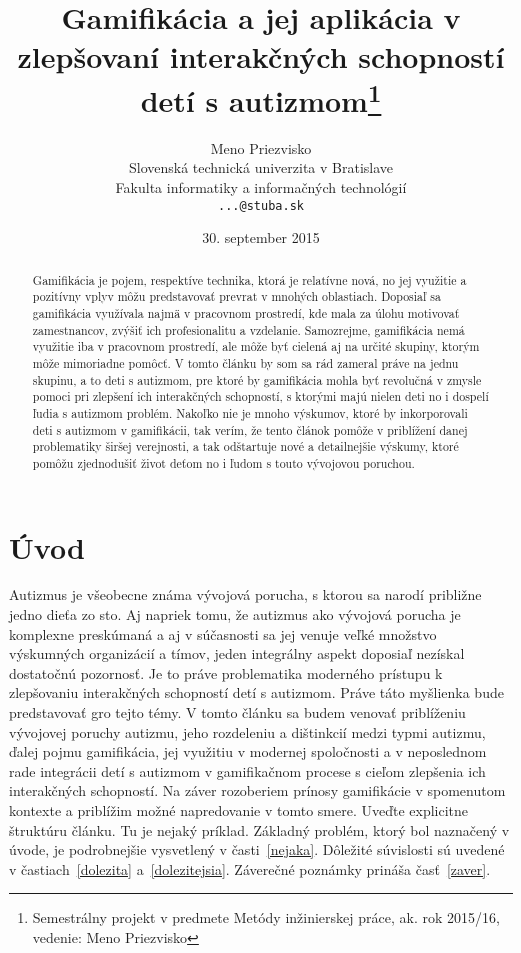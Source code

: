 \documentclass[10pt,twoside,slovak,a4paper]{coursepaper}
\title{Gamifikácia a jej aplikácia v zlepšovaní interakčných schopností detí s autizmom\thanks{Semestrálny projekt v predmete Metódy inžinierskej práce, ak. rok 2015/16, vedenie: Meno Priezvisko}} %
\author{Meno Priezvisko\\[2pt]
	{\small Slovenská technická univerzita v Bratislave}\\
	{\small Fakulta informatiky a informačných technológií}\\
	{\small \texttt{...@stuba.sk}}
	}
\date{\small 30. september 2015} %
\begin{document}
\maketitle

\begin{abstract}
Gamifikácia je pojem, respektíve technika, ktorá je relatívne nová, no jej využitie a pozitívny vplyv môžu predstavovať prevrat v mnohých oblastiach. Doposiaľ sa gamifikácia využívala najmä v pracovnom prostredí, kde mala za úlohu motivovať zamestnancov, zvýšiť ich profesionalitu a vzdelanie. Samozrejme, gamifikácia nemá využitie iba v pracovnom prostredí, ale môže byť cielená aj na určité skupiny, ktorým môže mimoriadne pomôcť. 
V tomto článku by som sa rád zameral práve na jednu skupinu, a to deti s autizmom, pre ktoré by gamifikácia mohla byť revolučná v zmysle pomoci pri zlepšení ich interakčných schopností, s ktorými majú nielen deti no i dospelí ľudia s autizmom problém. Nakoľko nie je mnoho výskumov, ktoré by inkorporovali deti s autizmom v gamifikácii, tak verím, že tento článok pomôže v priblížení danej problematiky širšej verejnosti, a tak odštartuje nové a detailnejšie výskumy, ktoré pomôžu zjednodušiť život deťom no i ľudom s touto vývojovou poruchou. 
\end{abstract}



\section{Úvod}

Autizmus je všeobecne známa vývojová porucha, s ktorou sa narodí približne jedno dieťa zo sto. Aj napriek tomu, že autizmus ako vývojová porucha je komplexne preskúmaná a aj v súčasnosti sa jej venuje veľké množstvo výskumných organizácií a tímov, jeden integrálny aspekt doposiaľ nezískal dostatočnú pozornosť. Je to práve problematika moderného prístupu k zlepšovaniu interakčných schopností detí s autizmom. Práve táto myšlienka bude predstavovať gro tejto témy. V tomto článku sa budem venovať priblíženiu vývojovej poruchy autizmu, jeho rozdeleniu a dištinkcií medzi typmi autizmu, ďalej pojmu gamifikácia, jej využitiu v modernej spoločnosti a v neposlednom rade integrácii detí s autizmom v gamifikačnom procese s cieľom zlepšenia ich interakčných schopností. Na záver rozoberiem prínosy gamifikácie v spomenutom kontexte a priblížim možné napredovanie v tomto smere.   
Uveďte explicitne štruktúru článku. Tu je nejaký príklad.
Základný problém, ktorý bol naznačený v úvode, je podrobnejšie vysvetlený v časti~\ref{nejaka}.
Dôležité súvislosti sú uvedené v častiach~\ref{dolezita} a~\ref{dolezitejsia}.
Záverečné poznámky prináša časť~\ref{zaver}.
\end{document}
